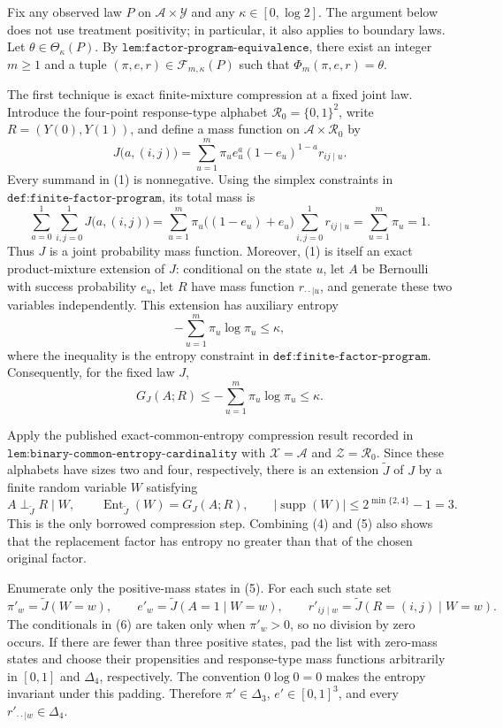 Fix any observed law \(P\) on \(\mathcal A\times\mathcal Y\) and any
\(\kappa\in[0,\log 2]\).  The argument below does not use treatment
positivity; in particular, it also applies to boundary laws.  Let
\(\theta\in\Theta_\kappa(P)\).  By
\(\texttt{lem:factor-program-equivalence}\), there exist an integer
\(m\geq 1\) and a tuple \((\pi,e,r)\in\mathcal F_{m,\kappa}(P)\) such that
\(\Phi_m(\pi,e,r)=\theta\).

The first technique is exact finite-mixture compression at a fixed joint
law.  Introduce the four-point response-type alphabet
\(\mathcal R_0=\{0,1\}^2\), write \(R=(Y(0),Y(1))\), and define a mass
function on \(\mathcal A\times\mathcal R_0\) by
\[
 J\bigl(a,(i,j)\bigr)
 =\sum_{u=1}^m \pi_u e_u^a(1-e_u)^{1-a}r_{ij\mid u}.
 \tag{1}
\]
Every summand in (1) is nonnegative.  Using the simplex constraints in
\(\texttt{def:finite-factor-program}\), its total mass is
\[
 \sum_{a=0}^1\sum_{i,j=0}^1J\bigl(a,(i,j)\bigr)
 =\sum_{u=1}^m\pi_u\bigl((1-e_u)+e_u\bigr)
       \sum_{i,j=0}^1r_{ij\mid u}
 =\sum_{u=1}^m\pi_u=1.
 \tag{2}
\]
Thus \(J\) is a joint probability mass function.  Moreover, (1) is itself
an exact product-mixture extension of \(J\): conditional on the state
\(u\), let \(A\) be Bernoulli with success probability \(e_u\), let
\(R\) have mass function \(r_{\cdot\cdot\mid u}\), and generate these two
variables independently.  This extension has auxiliary entropy
\[
 -\sum_{u=1}^m\pi_u\log\pi_u\leq\kappa,
 \tag{3}
\]
where the inequality is the entropy constraint in
\(\texttt{def:finite-factor-program}\).  Consequently, for the fixed law
\(J\),
\[
 G_J(A;R)\leq-\sum_{u=1}^m\pi_u\log\pi_u\leq\kappa.
 \tag{4}
\]

Apply the published exact-common-entropy compression result recorded in
\(\texttt{lem:binary-common-entropy-cardinality}\) with
\(\mathcal X=\mathcal A\) and \(\mathcal Z=\mathcal R_0\).  Since these
alphabets have sizes two and four, respectively, there is an extension
\(\widetilde J\) of \(J\) by a finite random variable \(W\) satisfying
\[
 A\perp_{\widetilde J}R\mid W,
 \qquad
 \operatorname{Ent}_{\widetilde J}(W)=G_J(A;R),
 \qquad
 |\operatorname{supp}(W)|
 \leq 2^{\min\{2,4\}}-1=3.
 \tag{5}
\]
This is the only borrowed compression step.  Combining (4) and (5) also
shows that the replacement factor has entropy no greater than that of the
chosen original factor.

Enumerate only the positive-mass states in (5).  For each such state set
\[
 \pi'_w=\widetilde J(W=w),\qquad
 e'_w=\widetilde J(A=1\mid W=w),\qquad
 r'_{ij\mid w}=\widetilde J(R=(i,j)\mid W=w).
 \tag{6}
\]
The conditionals in (6) are taken only when \(\pi'_w>0\), so no division by
zero occurs.  If there are fewer than three positive states, pad the list
with zero-mass states and choose their propensities and response-type mass
functions arbitrarily in \([0,1]\) and \(\Delta_4\), respectively.  The
convention \(0\log 0=0\) makes the entropy invariant under this padding.
Therefore \(\pi'\in\Delta_3\), \(e'\in[0,1]^3\), and every
\(r'_{\cdot\cdot\mid w}\in\Delta_4\).

